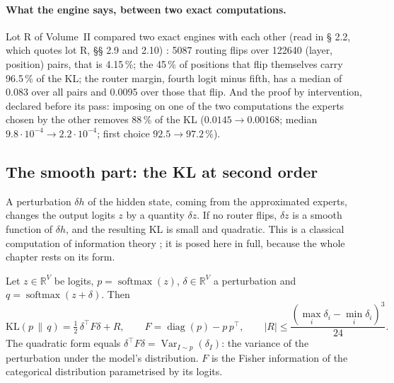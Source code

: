 \paragraph{What the engine says, between two exact computations.} Lot R of Volume~II compared two exact engines with each other (read in  § 2.2, which quotes lot R, §§ 2.9 and 2.10) \mes: \num{5087} routing flips over \num{122640} (layer, position) pairs, that is 4.15\,\%; the 45\,\% of positions that flip themselves carry 96.5\,\% of the KL; the router margin, fourth logit minus fifth, has a median of 0.083 over all pairs and 0.0095 over those that flip. And the proof by intervention, declared before its pass: imposing on one of the two computations the experts chosen by the other removes 88\,\% of the KL ($0.0145 \to 0.00168$; median $9.8\cdot10^{-4} \to 2.2\cdot10^{-4}$; first choice $92.5 \to 97.2\,\%$).

\subsection{The smooth part: the KL at second order}

A perturbation $\delta h$ of the hidden state, coming from the approximated experts, changes the output logits $z$ by a quantity $\delta z$. If no router flips, $\delta z$ is a smooth function of $\delta h$, and the resulting KL is small and quadratic. This is a classical computation of information theory \parencite{cover2006}; it is posed here in full, because the whole chapter rests on its form.

\begin{proposition}\label{t3syn:prop:kl2}
Let $z \in \mathbb{R}^V$ be logits, $p = \operatorname{softmax}(z)$, $\delta \in \mathbb{R}^V$ a perturbation and $q = \operatorname{softmax}(z + \delta)$. Then
\begin{equation}\label{t3syn:eq:kl2}
\mathrm{KL}(p \,\|\, q) = \tfrac12\, \delta^{\top} F \delta + R, \qquad F = \operatorname{diag}(p) - p\,p^{\top}, \qquad |R| \le \frac{(\max_i \delta_i - \min_i \delta_i)^3}{24}.
\end{equation}
The quadratic form equals $\delta^{\top} F \delta = \operatorname{Var}_{I \sim p}(\delta_I)$: the variance of the perturbation under the model's distribution. $F$ is the Fisher information of the categorical distribution parametrised by its logits.
\end{proposition}


